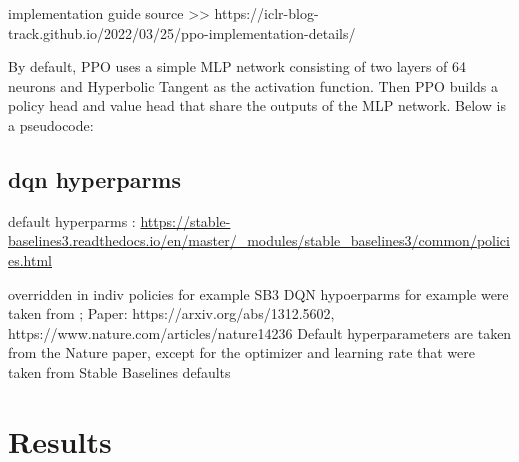 \documentclass[]{article}
\begin{document}
implementation guide source >> https://iclr-blog-track.github.io/2022/03/25/ppo-implementation-details/

By default, PPO uses a simple MLP network consisting of two layers of 64 neurons and Hyperbolic Tangent as the activation function. Then PPO builds a policy head and value head that share the outputs of the MLP network. Below is a pseudocode:

\subsection{dqn hyperparms}


default hyperparms : \url{https://stable-baselines3.readthedocs.io/en/master/_modules/stable_baselines3/common/policies.html}

overridden in indiv policies for example 
SB3 DQN hypoerparms for example were taken from ;
Paper: https://arxiv.org/abs/1312.5602, https://www.nature.com/articles/nature14236
Default hyperparameters are taken from the Nature paper,
except for the optimizer and learning rate that were taken from Stable Baselines defaults



\section{Results}
\end{document}
